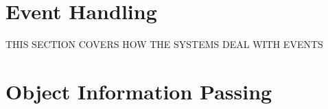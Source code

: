 \documentclass[a4paper,14pt]{article}
\begin{document}
\section{Event Handling} %
\label{sec:event_handling}
THIS SECTION COVERS HOW THE SYSTEMS DEAL WITH EVENTS

\section{Object Information Passing} %
\label{sec:object_information_passing}


\newpage
\scriptsize{}

\end{document}
